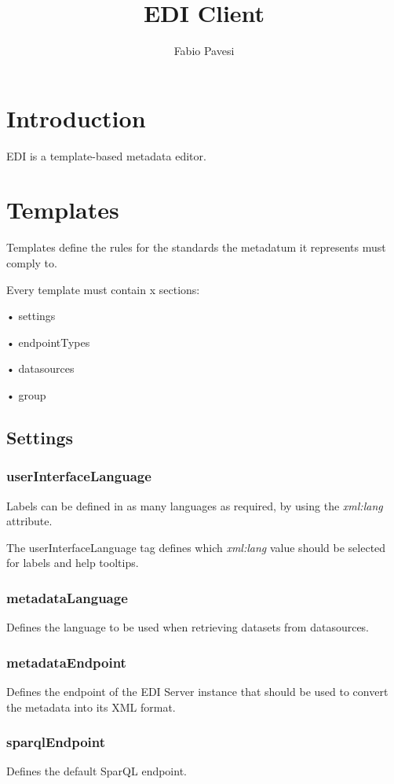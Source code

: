 \documentclass[10pt]{article}
\author{Fabio Pavesi}
\title{EDI Client}
\begin{document}
\maketitle
\newpage
\tableofcontents
\newpage

	\section{Introduction}
		EDI is a template-based metadata editor.
	\section{Templates}
	Templates define the rules for the standards the metadatum it represents must comply to.
	
	Every template must contain x sections:
	
	• settings
	
	• endpointTypes
	
	• datasources
	
	• group
	
	\subsection{Settings}
	
	\subsubsection{userInterfaceLanguage}
	
	Labels can be defined in as many languages as required, by using the \textit{xml:lang} attribute.
	
	The userInterfaceLanguage tag defines which \textit{xml:lang} value should be selected for labels and help tooltips.
	
	\subsubsection{metadataLanguage}
	
	Defines the language to be used when retrieving datasets from datasources.
	
	\subsubsection{metadataEndpoint}
	Defines the endpoint of the EDI Server instance that should be used to convert the metadata into its XML format.
	
	\subsubsection{sparqlEndpoint}
	Defines the default SparQL endpoint.
	
\end{document}
